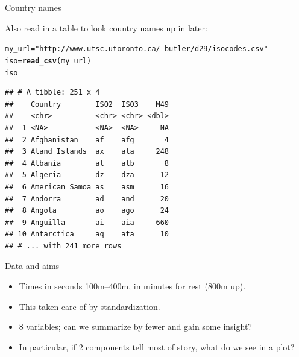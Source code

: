 \documentclass[unknownkeysallowed]{beamer}\usepackage[]{graphicx}\usepackage[]{color}
\makeatletter
\newcommand{\hlstr}[1]{\textcolor[rgb]{0.192,0.494,0.8}{#1}}%
\newcommand{\hlstd}[1]{\textcolor[rgb]{0.345,0.345,0.345}{#1}}%
\newcommand{\hlkwb}[1]{\textcolor[rgb]{0.69,0.353,0.396}{#1}}%
\newcommand{\hlkwd}[1]{\textcolor[rgb]{0.737,0.353,0.396}{\textbf{#1}}}%
\newenvironment{kframe}{%
 \def\at@end@of@kframe{}%
 \ifinner\ifhmode%
  \def\at@end@of@kframe{\end{minipage}}%
  \begin{minipage}{\columnwidth}%
 \fi\fi%
 \def\FrameCommand##1{\hskip\@totalleftmargin \hskip-\fboxsep
 \colorbox{shadecolor}{##1}\hskip-\fboxsep
     \hskip-\linewidth \hskip-\@totalleftmargin \hskip\columnwidth}%
 \MakeFramed {\advance\hsize-\width
   \@totalleftmargin\z@ \linewidth\hsize
   \@setminipage}}%
 {\par\unskip\endMakeFramed%
 \at@end@of@kframe}
\newenvironment{knitrout}{}{} %
\makeatother
\begin{document}
\begin{frame}[fragile]{Country names}
  
Also read in a table to look country names up in later:

\begin{knitrout}\small
{}\color{fgcolor}\begin{kframe}
\begin{alltt}
\hlstd{my_url}\hlkwb{=}\hlstr{"http://www.utsc.utoronto.ca/~butler/d29/isocodes.csv"}
\hlstd{iso}\hlkwb{=}\hlkwd{read_csv}\hlstd{(my_url)}
\hlstd{iso}
\end{alltt}
\begin{verbatim}
## # A tibble: 251 x 4
##    Country        ISO2  ISO3    M49
##    <chr>          <chr> <chr> <dbl>
##  1 <NA>           <NA>  <NA>     NA
##  2 Afghanistan    af    afg       4
##  3 Aland Islands  ax    ala     248
##  4 Albania        al    alb       8
##  5 Algeria        dz    dza      12
##  6 American Samoa as    asm      16
##  7 Andorra        ad    and      20
##  8 Angola         ao    ago      24
##  9 Anguilla       ai    aia     660
## 10 Antarctica     aq    ata      10
## # ... with 241 more rows
\end{verbatim}
\end{kframe}
\end{knitrout}
  
\end{frame}

\begin{frame}[fragile]{Data and aims}

  \begin{itemize}
  \item 
Times in seconds 100m--400m, in minutes for rest (800m up).
\item This taken care of by standardization.
\item 8 variables; can we summarize by fewer and gain some insight?
\item In particular, if 2 components tell most of story, what do we see in a plot?

  \end{itemize}

  
\end{frame}
\end{document}
